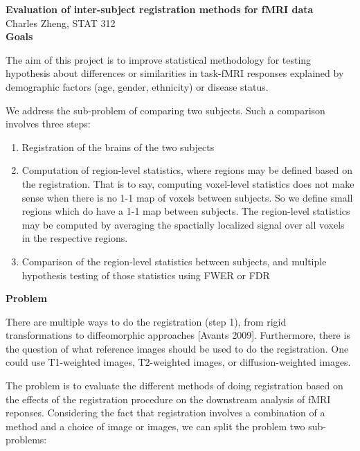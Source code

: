 \documentclass[11pt]{article}
\begin{document}
\newcommand{\tr}{\text{tr}}
\newcommand{\E}{\textbf{E}}
\newcommand{\diag}{\text{diag}}
\newcommand{\argmax}{\text{argmax}}
\newcommand{\Cov}{\text{Cov}}



\noindent\textbf{Evaluation of inter-subject registration methods for fMRI data}\\
Charles Zheng, STAT 312
\\

\noindent\textbf{Goals}

The aim of this project is to improve statistical methodology for testing hypothesis about differences or similarities in task-fMRI responses explained by demographic factors (age, gender, ethnicity) or disease status.

We address the sub-problem of comparing two subjects.  Such a comparison involves three steps:

\begin{enumerate}
\item Registration of the brains of the two subjects
\item Computation of region-level statistics, where regions may be defined based on the registration.  That is to say, computing voxel-level statistics does not make sense when there is no 1-1 map of voxels between subjects.  So we define small regions which do have a 1-1 map between subjects.  The region-level statistics may be computed by averaging the spactially localized signal over all voxels in the respective regions.
\item Comparison of the region-level statistics between subjects, and multiple hypothesis testing of those statistics using FWER or FDR
\end{enumerate}



\noindent\textbf{Problem}

There are multiple ways to do the registration (step 1), from rigid transformations to diffeomorphic approaches [Avants 2009].  Furthermore, there is the question of what reference images should be used to do the registration.  One could use T1-weighted images, T2-weighted images, or diffusion-weighted images.

The problem is to evaluate the different methods of doing registration based on the effects of the registration procedure on the downstream analysis of fMRI reponses.  Considering the fact that registration involves a combination of a method and a choice of image or images, we can split the problem two sub-problems:
\end{document}
